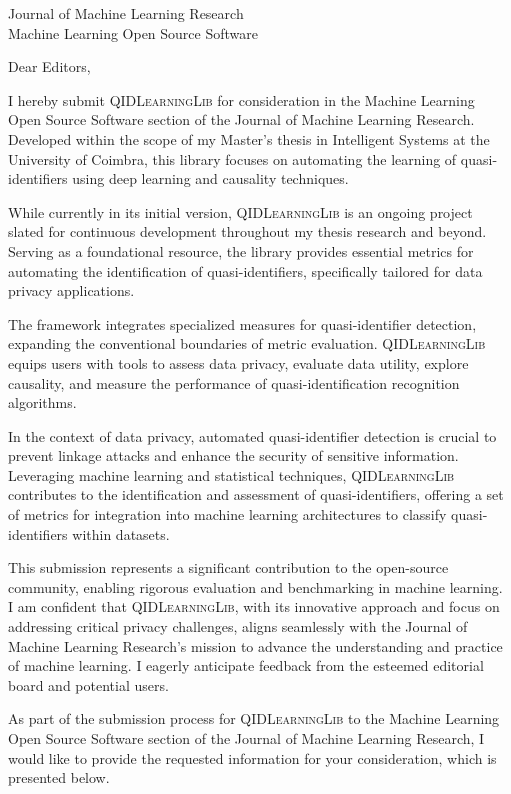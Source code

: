 \documentclass{letter}
\begin{document}
\begin{letter}{Journal of Machine Learning Research\\
    Machine Learning Open Source Software
}

\opening{Dear Editors,}


I hereby submit \textsc{QIDLearningLib} for consideration in the Machine Learning Open Source Software section of the Journal of Machine Learning Research. Developed within the scope of my Master's thesis in Intelligent Systems at the University of Coimbra, this library focuses on automating the learning of quasi-identifiers using deep learning and causality techniques.

While currently in its initial version, \textsc{QIDLearningLib} is an ongoing project slated for continuous development throughout my thesis research and beyond. Serving as a foundational resource, the library provides essential metrics for automating the identification of quasi-identifiers, specifically tailored for data privacy applications.

The framework integrates specialized measures for quasi-identifier detection, expanding the conventional boundaries of metric evaluation. \textsc{QIDLearningLib} equips users with tools to assess data privacy, evaluate data utility, explore causality, and measure the performance of quasi-identification recognition algorithms.

In the context of data privacy, automated quasi-identifier detection is crucial to prevent linkage attacks and enhance the security of sensitive information. Leveraging machine learning and statistical techniques, \textsc{QIDLearningLib} contributes to the identification and assessment of quasi-identifiers, offering a set of metrics for integration into machine learning architectures to classify quasi-identifiers within datasets.

This submission represents a significant contribution to the open-source community, enabling rigorous evaluation and benchmarking in machine learning. I am confident that \textsc{QIDLearningLib}, with its innovative approach and focus on addressing critical privacy challenges, aligns seamlessly with the Journal of Machine Learning Research's mission to advance the understanding and practice of machine learning. I eagerly anticipate feedback from the esteemed editorial board and potential users.

 As part of the submission process for \textsc{QIDLearningLib} to the Machine Learning Open Source Software section of the Journal of Machine Learning Research, I would like to provide the requested information for your consideration, which is presented below.



\end{letter}
\end{document}
